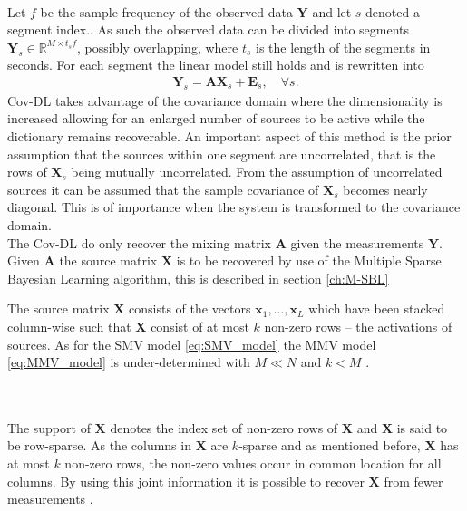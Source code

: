 \\
Let $f$ be the sample frequency of the observed data $\mathbf{Y}$ and let $s$ denoted a segment index.. As such the observed data can be divided into segments $\mathbf{Y}_s \in \mathbb{R}^{M \times t_s f}$, possibly overlapping, where $t_s$ is the length of the segments in seconds. For each segment the linear model still holds and is rewritten into
\begin{align*}
\mathbf{Y}_s = \mathbf{AX}_s + \textbf{E}_s, \quad \forall s.
\end{align*}
Cov-DL takes advantage of the covariance domain where the dimensionality is increased allowing for an enlarged number of sources to be active while the dictionary remains recoverable.  
An important aspect of this method is the prior assumption that the sources within one segment are uncorrelated, that is the rows of $\textbf{X}_s$ being mutually uncorrelated. 
From the assumption of uncorrelated sources it can be assumed that the sample covariance of $\textbf{X}_s$ becomes nearly diagonal. This is of importance when the system is transformed to the covariance domain.    
\\
The Cov-DL do only recover the mixing matrix $\mathbf{A}$ given the measurements $\textbf{Y}$. Given $\textbf{A}$ the source matrix $\mathbf{X}$ is to be recovered by use of the Multiple Sparse Bayesian Learning algorithm, this is described in section \ref{ch:M-SBL} 


The source matrix $\mathbf{X}$ consists of the vectors $\mathbf{x}_1, \dots, \mathbf{x}_L$ which have been stacked column-wise such that $\mathbf{X}$ consist of at most $k$ non-zero rows -- the activations of sources. As for the SMV model \eqref{eq:SMV_model} the MMV model \eqref{eq:MMV_model} is under-determined with $M \ll N$ and $k < M$ \cite[p. 42]{CS}.


\\ \\
The support of $\mathbf{X}$ denotes the index set of non-zero rows of $\mathbf{X}$ and $\mathbf{X}$ is said to be row-sparse. As the columns in $\mathbf{X}$ are $k$-sparse and as mentioned before, $\mathbf{X}$ has at most $k$ non-zero rows, the non-zero values occur in common location for all columns. By using this joint information it is possible to recover $\mathbf{X}$ from fewer measurements \cite[p. 43]{CS}.

